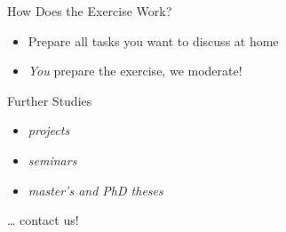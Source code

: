 \begin{frame}[label=Exam]{\myframetitle}
\begin{fancycolumns}
		\begin{note}{How Does the Exercise Work?}
			\begin{itemize}
				\item Prepare all tasks you want to discuss at home
				\item \emph{You} prepare the exercise, we moderate!
			\end{itemize}
		\end{note}

		\begin{note}{Further Studies}
			\begin{itemize}
				\item \emph{projects}
				\item \emph{seminars}
				\item \emph{master's and PhD theses}
			\end{itemize}
			\ldots{} contact us!
		\end{note}
	\end{fancycolumns}
\end{frame}
